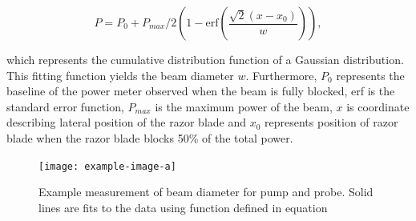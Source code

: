 \begin{equation}
	P = P_0 + P_{max}/2 \left( 1 - \mathrm{erf} \left( \dfrac{\sqrt{2}(x - x_0)}{w} \right) \right),
\end{equation}

which represents the cumulative distribution function of a Gaussian distribution. This fitting function yields the beam diameter $w$. Furthermore, $P_0$ represents the baseline of the power meter observed when the beam is fully blocked, erf is the standard error function, $P_{max}$ is the maximum power of the beam, $x$ is coordinate describing lateral position of the razor blade and $x_0$ represents position of razor blade when the razor blade blocks 50\% of the total power.  



\begin{figure}[h]
	\centering
	\texttt{[image: example-image-a]}
	\caption{Example measurement of beam diameter for pump and probe. Solid lines are fits to the data using function defined in equation}
		\label{fig:beam_diamter_measurement}
\end{figure}



